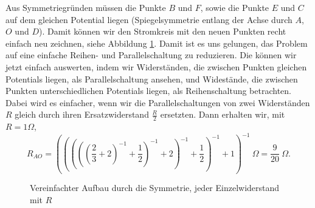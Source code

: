 \begin{Answer}[ref = wdsss]
	Aus Symmetriegründen müssen die Punkte $B$ und $F$, sowie die Punkte $E$ und $C$ auf dem gleichen Potential liegen (Spiegelsymmetrie entlang der Achse durch $A$, $O$ und $D$). Damit können wir den Stromkreis mit den neuen Punkten recht einfach neu zeichnen, siehe Abbildung \ref{fig:wdsss1}. Damit ist es uns gelungen, das Problem auf eine einfache Reihen- und Parallelschaltung zu reduzieren. Die können wir jetzt einfach auswerten, indem wir Widerständen, die zwischen Punkten gleichen Potentials liegen, als Parallelschaltung ansehen, und Widestände, die zwischen Punkten unterschiedlichen Potentials liegen, als Reihenschaltung betrachten. Dabei wird es einfacher, wenn wir die Parallelschaltungen von zwei Widerständen $R$ gleich durch ihren Ersatzwiderstand $\frac{R}{2}$ ersetzten. Dann erhalten wir, mit $R = 1\Omega$,
	\begin{equation}
		\boxed{
		R_{AO}=\left(\left(\left(\left(\left(\frac{2}{3} + 2\right)^{-1} +\frac{1}{2}\right)^{-1} + 2\right)^{-1} + \frac{1}{2}\right)^{-1} + 1\right)^{-1}~\Omega = \frac{9}{20}~\Omega.
			}
	\end{equation}
\end{Answer}
\begin{figure}[h]
\centering

\caption{Vereinfachter Aufbau durch die Symmetrie, jeder Einzelwiderstand mit $R$}
\label{fig:wdsss1}
\end{figure}

